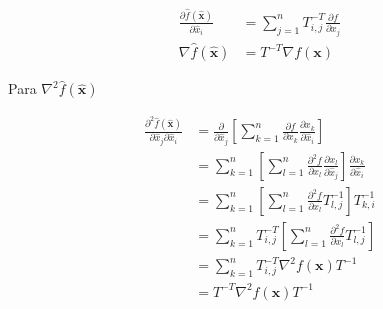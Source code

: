 \documentclass{article}
\begin{document}
\begin{multicols}{2}
\begin{align}
  \frac{\partial \hat{f}(\hat{\boldsymbol{x}})}{\partial \hat{x}_i} & = \sum_{j=1}^{n}T^{-T}_{i,j}\frac{\partial f}{\partial x_j}\\
  \nabla \hat{f}(\hat{\boldsymbol{x}}) &= T^{-T}\nabla {f}(\boldsymbol{x})
\end{align}

Para $\nabla^2 \hat{f}(\hat{\boldsymbol{x}})$

\begin{align*}
  \frac{\partial^2 \hat{f}(\hat{\boldsymbol{x}})}{\partial \hat{x}_j \partial \hat{x}_i} & = \frac{\partial}{\partial\hat{x}_j} \left[\sum_{k=1}^{n}\frac{\partial f}{\partial x_k}\frac{\partial x_k}{\partial \hat{x}_i}\right]\\
  & = \sum_{k=1}^{n} \left[\sum_{l=1}^{n}\frac{\partial^2 f}{\partial x_l}\frac{\partial x_l}{\partial \hat{x}_j}\right]\frac{\partial x_k}{\partial \hat{x}_i}\\
  & = \sum_{k=1}^{n} \left[\sum_{l=1}^{n}\frac{\partial^2 f}{\partial x_l}T^{-1}_{l, j}\right]T^{-1}_{k, i}\\
  & = \sum_{k=1}^{n} T^{-T}_{i, j}\left[\sum_{l=1}^{n}\frac{\partial^2 f}{\partial x_l}T^{-1}_{l, j}\right]\\
  & = \sum_{k=1}^{n} T^{-T}_{i, j} \nabla^2 f(\boldsymbol{x}) T^{-1}\\
  & = T^{-T} \nabla^2 f(\boldsymbol{x}) T^{-1}
\end{align*}


\end{multicols}
\end{document}

